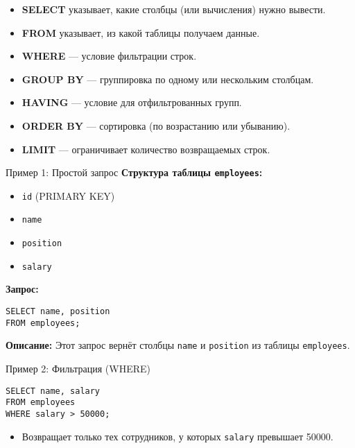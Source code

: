 \documentclass{beamer}
\begin{document}
\begin{frame}
	\begin{itemize}
		\item \textbf{SELECT} указывает, какие столбцы (или вычисления) нужно вывести.
		\item \textbf{FROM} указывает, из какой таблицы получаем данные.
		\item \textbf{WHERE} --- условие фильтрации строк.
		\item \textbf{GROUP BY} --- группировка по одному или нескольким столбцам.
		\item \textbf{HAVING} --- условие для отфильтрованных групп.
		\item \textbf{ORDER BY} --- сортировка (по возрастанию или убыванию).
		\item \textbf{LIMIT} --- ограничивает количество возвращаемых строк.
	\end{itemize}
\end{frame}

\begin{frame}[fragile]{Пример 1: Простой запрос}
	\textbf{Структура таблицы \texttt{employees}:}
	\begin{itemize}
		\item \texttt{id} (PRIMARY KEY)
		\item \texttt{name}
		\item \texttt{position}
		\item \texttt{salary}
	\end{itemize}

	\textbf{Запрос:}
	\begin{verbatim}
SELECT name, position
FROM employees;
\end{verbatim}

	\textbf{Описание:}
	Этот запрос вернёт столбцы \texttt{name} и \texttt{position} из таблицы \texttt{employees}.
\end{frame}

\begin{frame}[fragile]{Пример 2: Фильтрация (WHERE)}
	\begin{verbatim}
SELECT name, salary
FROM employees
WHERE salary > 50000;
\end{verbatim}
	\begin{itemize}
		\item Возвращает только тех сотрудников, у которых \texttt{salary} превышает 50000.
	\end{itemize}
\end{frame}
\end{document}

